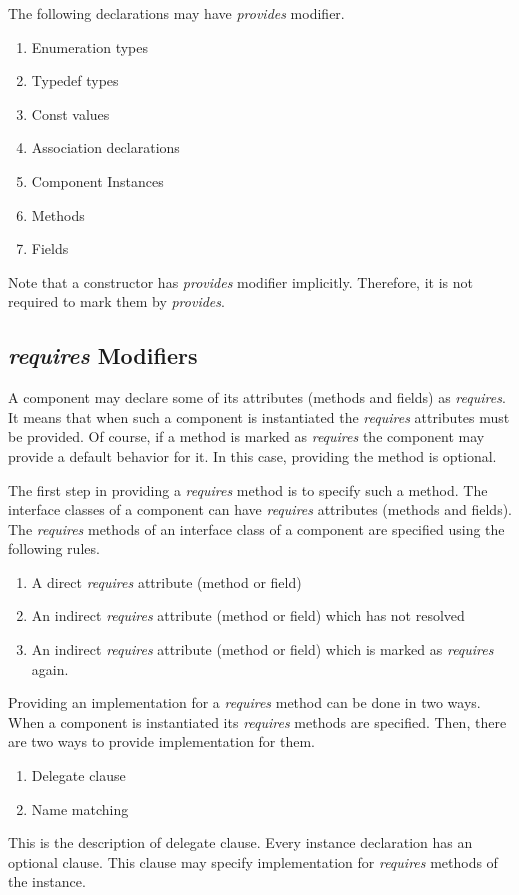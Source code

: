 \documentclass[acmsmall]{acmart}
\begin{document}
The following declarations may have \textit{provides} modifier.
\begin{enumerate}
\item Enumeration types
\item Typedef types
\item Const values
\item Association declarations
\item Component Instances
\item Methods
\item Fields
\end{enumerate}
Note that a constructor has \textit{provides} modifier implicitly.
Therefore, it is not required to mark them by \textit{provides}.

\subsection{\textit{requires} Modifiers}
A component may declare some of its attributes (methods and fields) as \textit{requires}.
It means that when such a component is instantiated the \textit{requires} attributes must be provided.
Of course, if a method is marked as \textit{requires} the component may provide a default behavior for it.
In this case, providing the method is optional.

The first step in providing a \textit{requires} method is to specify such a method.
The interface classes of a component can have \textit{requires} attributes (methods and fields).
The \textit{requires} methods of an interface class of a component are specified using the following rules.
\begin{enumerate}
\item A direct \textit{requires} attribute (method or field)
\item An indirect \textit{requires} attribute (method or field) which has not resolved
\item An indirect \textit{requires} attribute (method or field) which is marked as \textit{requires} again.
\end{enumerate}

Providing an implementation for a \textit{requires} method can be done in two ways.
When a component is instantiated its \textit{requires} methods are specified.
Then, there are two ways to provide implementation for them.
\begin{enumerate}
\item Delegate clause
\item Name matching
\end{enumerate}
This is the description of delegate clause.
Every instance declaration has an optional clause.
This clause may specify implementation for \textit{requires} methods of the instance.
\end{document}
